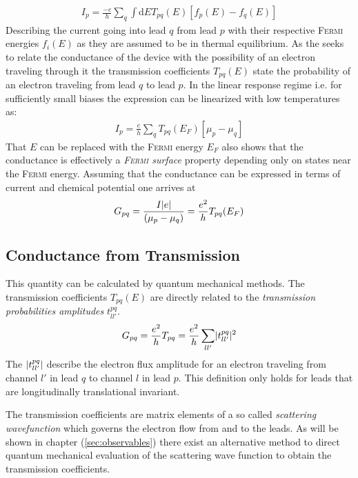 \begin{align}
I_p=\frac{-e}{h} \sum_q \int \text{d}E T_{pq}(E) [f_p(E) - f_q(E)]
\label{eqn:current}
\end{align}
Describing the current going into lead $q$ from lead $p$ with their respective \textsc{Fermi} energies $f_i(E)$ as they are assumed to be in thermal equilibrium. 
As the \lanbform{} seeks to relate the conductance of the device with the possibility of an electron traveling through it the transmission coefficients $T_{pq}(E)$ state the probability of an electron traveling from lead $q$ to lead $p$. 
In the linear response regime i.e. for sufficiently small biases the expression can be linearized with low temperatures as:
\begin{align}
I_p=\frac{e}{h} \sum_q T_{pq}(E_F) [\mu_p - \mu_q]
\label{eqn:currentlin}
\end{align}
That $E$ can be replaced with the \textsc{Fermi} energy $E_F$ also shows that the conductance is effectively a \emph{\textsc{Fermi} surface} property depending only on states near the \textsc{Fermi} energy.
Assuming that the conductance can be expressed in terms of current and chemical potential one arrives at
\begin{align}
G_{pq}=\frac{I\lvert e\rvert}{(\mu_p - \mu_q)}=\frac{e^2}{h} T_{pq}(E_F)
\label{eqn:conductance}
\end{align}
\subsection{Conductance from Transmission}\label{sec:conductancefromtransmission}
This quantity can be calculated by quantum mechanical methods. The transmission coefficients $T_{pq}(E)$ are directly related to the \emph{transmission probabilities amplitudes} $t^{pq}_{ll'}$.
\begin{align}
G_{pq}=\frac{e^2}{h} T_{pq} =\frac{e^2}{h} \sum_{ll'} \lvert t^{pq}_{ll'}\rvert^2
\label{eqn:transcoeff}
\end{align}
The $\lvert t^{pq}_{ll'}\rvert$ describe the electron flux amplitude for an electron traveling from channel $l'$ in lead $q$ to channel $l$ in lead $p$. This definition only holds for leads that are longitudinally translational invariant.\par
The transmission coefficients are matrix elements of a so called \emph{scattering wavefunction} which governs the electron flow from and to the leads\cite{Datta1997}. As will be shown in chapter (\ref{sec:observables}) there exist an alternative method to direct quantum mechanical evaluation of the scattering wave function to obtain the transmission coefficients.
